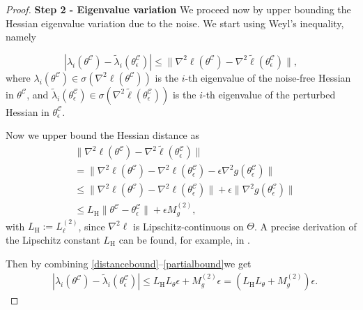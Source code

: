 \documentclass[letterpaper, 10 pt]{IEEEtran}  %
\begin{document}
\begin{proof}
   \textbf{Step 2 - Eigenvalue variation}
   We proceed now by upper bounding the Hessian eigenvalue variation due to the noise. 
   We start using Weyl's inequality, namely
    
   \begin{equation}
      |\lambda_i(\theta^\mathcal{C}) -\tilde{\lambda}_i(\theta^\mathcal{C}_\epsilon)| \leq \| \nabla^2 \ell (\theta^\mathcal{C}) - \nabla^2 \tilde{\ell}(\theta^\mathcal{C}_{\epsilon})\| \label{weyl},
   \end{equation}
   where $\lambda_i(\theta^\mathcal{C}) \in \sigma(\nabla^2 \ell (\theta^\mathcal{C}))$ is the $i$-th eigenvalue of the noise-free Hessian in $\theta^\mathcal{C}$, and 
     $\tilde\lambda_i(\theta^\mathcal{C}_\epsilon) \in \sigma(\nabla^2 \tilde\ell (\theta^\mathcal{C}_\epsilon))$ is the $i$-th eigenvalue of the perturbed Hessian in $\theta^\mathcal{C}_\epsilon$.
   
   Now we upper bound the Hessian distance as
   \begin{align}
      \nonumber & \| \nabla^2 \ell (\theta^\mathcal{C}) - \nabla^2 \tilde{\ell}(\theta^\mathcal{C}_{\epsilon})\| \\
      \nonumber & = \| \nabla^2 \ell (\theta^\mathcal{C}) - \nabla^2 \ell(\theta^\mathcal{C}_{\epsilon}) - \epsilon \nabla^2 g(\theta^\mathcal{C}_{\epsilon})\| \\
      \nonumber & \leq \|\nabla^2 \ell (\theta^\mathcal{C}) - \nabla^2 \ell(\theta^\mathcal{C}_{\epsilon})\| + \epsilon \|\nabla^2 g(\theta^\mathcal{C}_{\epsilon})\| \\
      & \leq L_\mathrm{H} \|\theta^\mathcal{C} - \theta^\mathcal{C}_{\epsilon}\| + \epsilon M_g^{(2)}, \label{partialbound}
   \end{align} 
   with $L_\mathrm{H}:= L_\ell^{(2)}$, since $\nabla^2 \ell$ is Lipschitz-continuous on $\Theta$. A precise derivation of the Lipschitz constant $L_\mathrm{H}$ can be found, for example, in \cite{Zunkovic2026}.
   
   Then by combining \eqref{distancebound}--\eqref{partialbound}we get 
   \begin{align}
      & |\lambda_i(\theta^\mathcal{C}) -\tilde{\lambda}_i(\theta^\mathcal{C}_\epsilon)| \leq L_\mathrm{H} L_\theta \epsilon + M_g^{(2)} \epsilon = (L_\mathrm{H} L_\theta + M_g^{(2)})\epsilon.
   \end{align}


\end{proof}
\end{document}
